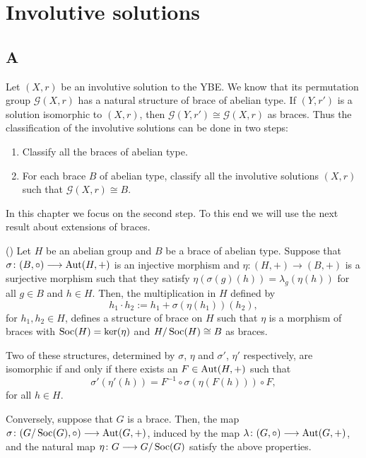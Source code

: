 \chapter{Involutive solutions}
\label{Isolutions}

\section*{A}

Let $(X,r)$ be an involutive solution to the YBE. We know that its permutation group $\mathcal{G}(X,r)$ has a natural structure of brace of abelian type. If $(Y,r')$ is a solution isomorphic to $(X,r)$, then $\mathcal{G}(Y,r')\cong\mathcal{G}(X,r)$ as braces. Thus the classification of the involutive solutions can be done in two steps:
\begin{enumerate}
	\item Classify all the braces of abelian type.
	\item For each brace $B$ of abelian type, classify all the involutive solutions $(X,r)$ such that $\mathcal{G}(X,r)\cong B$.
\end{enumerate}

In this chapter we focus on the second step. To this end we will use the next result about extensions of braces.

\begin{proposition}(\cite[Theorem~2.1]{MR3320237})\label{extensions}  Let $H$ be an abelian group and $B$
	be a brace of abelian type. Suppose  that $\sigma\colon
	(B,\circ)\longrightarrow \operatorname{Aut}(H,+)$ is an injective morphism and
	$\eta\colon (H,+)\longrightarrow (B,+)$ is a surjective morphism
	such that they satisfy $\eta(\sigma(g)(h))=\lambda_g(\eta(h))$ for
	all $g\in B$ and $h\in H$. Then, the multiplication in $H$ defined
	by
	$$h_1\cdot h_2:=h_1+\sigma(\eta (h_1))(h_2),$$
	for $h_1,h_2\in H$, defines a structure of brace on $H$
	such that $\eta$ is a morphism of braces  with
	$\operatorname{Soc}(H)=\ker(\eta)$ and $H/\operatorname{Soc}(H)\cong B$ as braces.
	
	Two of these structures, determined by $\sigma$, $\eta$ and
	$\sigma'$, $\eta'$ respectively, are isomorphic if and only if there
	exists an $F\in \operatorname{Aut}(H,+)$ such that
	$$
	\sigma'(\eta'(h))=F^{-1}\circ\sigma(\eta(F(h)))\circ F,
	$$
	for all $h\in H$.
	
	Conversely, suppose that $G$ is a brace. Then, the map
	$\sigma\colon (G/\operatorname{Soc}(G),\circ)\longrightarrow\operatorname{Aut}(G,+)$, induced by
	the map $\lambda\colon (G,\circ)\longrightarrow\operatorname{Aut}(G,+)$, and the
	natural map $\eta\colon G\longrightarrow G/\operatorname{Soc}(G)$ satisfy the
	above properties. 
\end{proposition}

